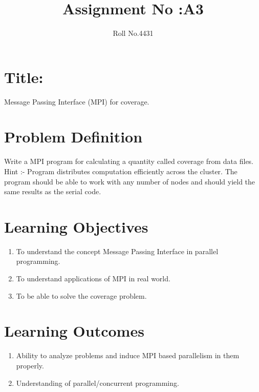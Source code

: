 \documentclass[10pt,a4paper]{article}
\title{Assignment No :A3}
\date{}
\author{Roll No.4431}
\begin{document}
\maketitle
\section{Title:}
Message Passing Interface (MPI) for coverage.

\section{Problem Definition}
Write a MPI program for calculating a quantity called coverage from data files.
Hint :- Program distributes computation efficiently across the cluster. The program should be able to
work with any number of nodes and should yield the same results as the serial code.

\section{Learning Objectives}
\begin{enumerate}
\item To understand the concept Message Passing Interface in parallel programming.
\item To understand applications of MPI in real world.
\item To be able to solve the coverage problem.
\end{enumerate}

\section{Learning Outcomes}
\begin{enumerate}
\item Ability to analyze problems and induce MPI based parallelism in them properly.
\item Understanding of parallel/concurrent programming.\end{enumerate}
\end{document}
